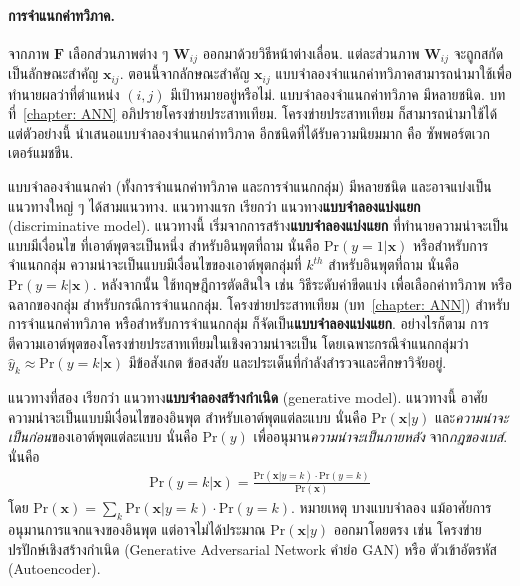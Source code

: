 \paragraph{การจำแนกค่าทวิภาค.}
จากภาพ $\bm{F}$ เลือกส่วนภาพต่าง ๆ $\bm{W}_{ij}$ ออกมาด้วยวิธีหน้าต่างเลื่อน.
แต่ละส่วนภาพ $\bm{W}_{ij}$ จะถูกสกัดเป็นลักษณะสำคัญ $\bm{x}_{ij}$.
ตอนนี้จากลักษณะสำคัญ $\bm{x}_{ij}$ แบบจำลองจำแนกค่าทวิภาคสามารถนำมาใช้เพื่อทำนายผลว่าที่ตำแหน่ง $(i,j)$
มีเป้าหมายอยู่หรือไม่.
แบบจำลองจำแนกค่าทวิภาค มีหลายชนิด.
บทที่~\ref{chapter: ANN} อภิปรายโครงข่ายประสาทเทียม.
โครงข่ายประสาทเทียม ก็สามารถนำมาใช้ได้
แต่ตัวอย่างนี้ นำเสนอแบบจำลองจำแนกค่าทวิภาค อีกชนิดที่ได้รับความนิยมมาก คือ ซัพพอร์ตเวกเตอร์แมชชีน.

แบบจำลองจำแนกค่า (ทั้งการจำแนกค่าทวิภาค และการจำแนกกลุ่ม) มีหลายชนิด และอาจแบ่งเป็นแนวทางใหญ่ ๆ ได้สามแนวทาง.
แนวทางแรก เรียกว่า แนวทาง\textbf{แบบจำลองแบ่งแยก} (discriminative model).
แนวทางนี้ เริ่มจากการสร้าง\textbf{แบบจำลองแบ่งแยก} ที่ทำนายความน่าจะเป็นแบบมีเงื่อนไข
ที่เอาต์พุตจะเป็นหนึ่ง สำหรับอินพุตที่ถาม นั่นคือ $\mathrm{Pr}(y=1|\bm{x})$ 
หรือสำหรับการจำแนกกลุ่ม ความน่าจะเป็นแบบมีเงื่อนไขของเอาต์พุตกลุ่มที่ $k^{th}$ สำหรับอินพุตที่ถาม นั่นคือ $\mathrm{Pr}(y=k|\bm{x})$.
หลังจากนั้น ใช้ทฤษฎีการตัดสินใจ เช่น วิธีระดับค่าขีดแบ่ง เพื่อเลือกค่าทวิภาพ หรือฉลากของกลุ่ม สำหรับกรณีการจำแนกกลุ่ม.
โครงข่ายประสาทเทียม (บท~\ref{chapter: ANN}) สำหรับการจำแนกค่าทวิภาค หรือสำหรับการจำแนกกลุ่ม ก็จัดเป็น\textbf{แบบจำลองแบ่งแยก}.
อย่างไรก็ตาม 
การตีความเอาต์พุตของโครงข่ายประสาทเทียมในเชิงความน่าจะเป็น โดยเฉพาะกรณีจำแนกกลุ่มว่า 
$\hat{y}_k \approx \mathrm{Pr}(y=k|\bm{x})$
มีข้อสังเกต ข้อสงสัย และประเด็นที่กำลังสำรวจและศึกษาวิจัยอยู่\cite{NakjaiEtAl2019a}.

แนวทางที่สอง เรียกว่า แนวทาง\textbf{แบบจำลองสร้างกำเนิด} (generative model).
แนวทางนี้ อาศัยความน่าจะเป็นแบบมีเงื่อนไขของอินพุต สำหรับเอาต์พุตแต่ละแบบ นั่นคือ $\mathrm{Pr}(\bm{x}|y)$
และ\textit{ความน่าจะเป็นก่อน}ของเอาต์พุตแต่ละแบบ นั่นคือ $\mathrm{Pr}(y)$
เพื่ออนุมาน\textit{ความน่าจะเป็นภายหลัง} จาก\textit{กฎของเบส์}.
นั่นคือ 
\begin{eqnarray}
\mathrm{Pr}(y=k|\bm{x}) = \frac{\mathrm{Pr}(\bm{x}|y=k) \cdot \mathrm{Pr}(y=k)}{\mathrm{Pr}(\bm{x})}
\label{eq: generative model}
\end{eqnarray}
โดย $\mathrm{Pr}(\bm{x}) = \sum_k \mathrm{Pr}(\bm{x}|y=k) \cdot \mathrm{Pr}(y=k)$.
หมายเหตุ บางแบบจำลอง แม้อาศัยการอนุมานการแจกแจงของอินพุต แต่อาจไม่ได้ประมาณ $\mathrm{Pr}(\bm{x}|y)$ ออกมาโดยตรง
เช่น โครงข่ายปรปักษ์เชิงสร้างกำเนิด (Generative Adversarial Network\cite{GoodfellowEtAl2014a} คำย่อ GAN)
หรือ ตัวเข้าอัตรหัส (Autoencoder\cite{KingmaWelling2019a}).

